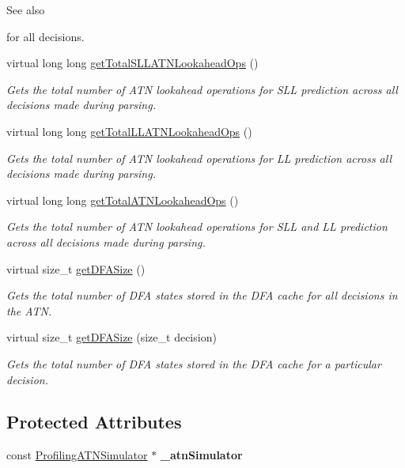 \begin{DoxyCompactItemize}
\begin{DoxyCompactList}
\begin{DoxySeeAlso}{See also}
\end{DoxySeeAlso}
for all decisions. \end{DoxyCompactList}\item 
virtual long long \hyperlink{classantlr4_1_1atn_1_1ParseInfo_a0d67b72cf3de480e3b2142711568129e}{get\+Total\+S\+L\+L\+A\+T\+N\+Lookahead\+Ops} ()
\begin{DoxyCompactList}\small\item\em Gets the total number of A\+TN lookahead operations for S\+LL prediction across all decisions made during parsing. \end{DoxyCompactList}\item 
virtual long long \hyperlink{classantlr4_1_1atn_1_1ParseInfo_aa99c2df168f4fe0673b6ae24900a33d9}{get\+Total\+L\+L\+A\+T\+N\+Lookahead\+Ops} ()
\begin{DoxyCompactList}\small\item\em Gets the total number of A\+TN lookahead operations for LL prediction across all decisions made during parsing. \end{DoxyCompactList}\item 
virtual long long \hyperlink{classantlr4_1_1atn_1_1ParseInfo_ad96f64c07f563177909d856a40f420fe}{get\+Total\+A\+T\+N\+Lookahead\+Ops} ()
\begin{DoxyCompactList}\small\item\em Gets the total number of A\+TN lookahead operations for S\+LL and LL prediction across all decisions made during parsing. \end{DoxyCompactList}\item 
virtual size\+\_\+t \hyperlink{classantlr4_1_1atn_1_1ParseInfo_a7b0cb79517c02b88f2c88a668461f359}{get\+D\+F\+A\+Size} ()
\begin{DoxyCompactList}\small\item\em Gets the total number of D\+FA states stored in the D\+FA cache for all decisions in the A\+TN. \end{DoxyCompactList}\item 
virtual size\+\_\+t \hyperlink{classantlr4_1_1atn_1_1ParseInfo_a335833b728bcbe7badebfcd88caf37f3}{get\+D\+F\+A\+Size} (size\+\_\+t decision)
\begin{DoxyCompactList}\small\item\em Gets the total number of D\+FA states stored in the D\+FA cache for a particular decision. \end{DoxyCompactList}\end{DoxyCompactItemize}
\subsection*{Protected Attributes}
\begin{DoxyCompactItemize}
\item 
\mbox{\label{classantlr4_1_1atn_1_1ParseInfo_a2ec7928b78a8b0fc12fe5435a79132ca}} 
const \hyperlink{classantlr4_1_1atn_1_1ProfilingATNSimulator}{Profiling\+A\+T\+N\+Simulator} $\ast$ {\bfseries \+\_\+atn\+Simulator}
\end{DoxyCompactItemize}


